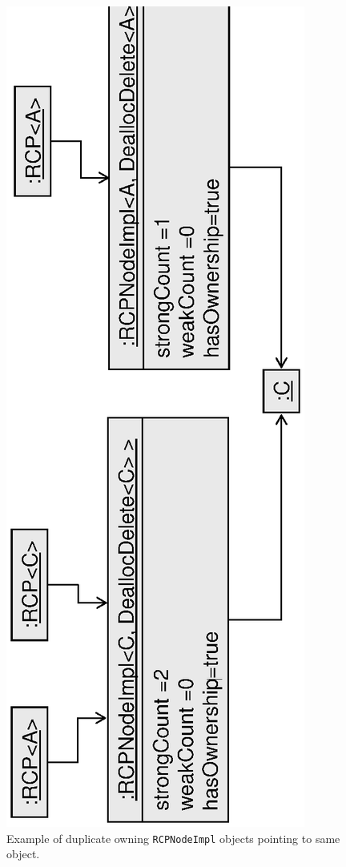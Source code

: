 \documentclass[pdf,ps2pdf,11pt]{SANDreport}
\begin{document}
{\begin{figure}
\begin{center}
\includegraphics*[angle=270,scale=0.65]{RCPEx2}
\end{center}
\caption{
\label{fig:RCPEx2}
Example of duplicate owning {}\texttt{RCPNodeImpl} objects pointing to
same object. }
\end{figure}
\esinglespace}
\end{document}
